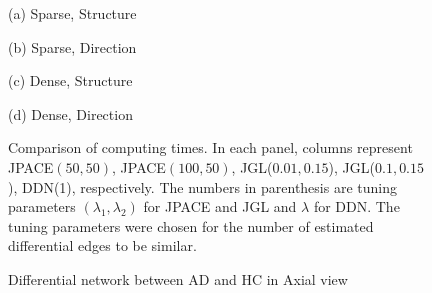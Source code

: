 \documentclass[useAMS,usenatbib,referee]{bio}
\begin{document}
{{\begin{figure}[htb!] %
\begin{center} \medskip
\begin{minipage}[b]{.48\linewidth}
  \centering   \centerline{}
  \centerline{(a) Sparse, Structure}
\end{minipage} \medskip
\begin{minipage}[b]{.48\linewidth}
  \centering   \centerline{}
  \centerline{(b) Sparse, Direction }
\end{minipage}
\medskip
\begin{minipage}[b]{.48\linewidth}
  \centering   \centerline{}
  \centerline{(c) Dense, Structure}
\end{minipage}
\begin{minipage}[b]{.48\linewidth}
  \centering   \centerline{}
  \centerline{(d) Dense, Direction}
\end{minipage}
\caption{Comparison of computing times. In each panel, columns represent JPACE$(50,50)$, JPACE$(100,50)$, JGL($0.01,0.15$), JGL($0.1,0.15$), DDN(1),
respectively. The numbers in parenthesis are tuning parameters 
$(\lambda_1, \lambda_2)$ for JPACE and JGL and $\lambda$ for DDN. 
The tuning parameters were chosen for the number of estimated 
differential edges to be similar.}
\end{center}
\end{figure}



\begin{figure}[htb!]
 \begin{minipage}[c]{.45\linewidth}
  \centering
\centerline{}
\end{minipage}
 \begin{minipage}[c]{.45\linewidth}
  \centering
\centerline{}
\end{minipage}
  \caption{Differential network between AD and HC in Axial view}
\label{axial}
\end{figure}


\clearpage




}}
\end{document}
